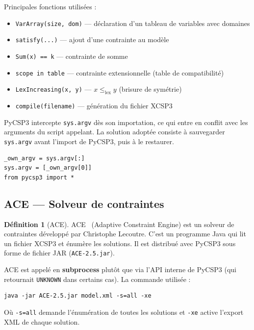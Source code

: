 \documentclass[12pt,a4paper]{article}
\theoremstyle{definition}
\newtheorem{definition}{Définition}[section]
\begin{document}
Principales fonctions utilisées :
\begin{itemize}
  \item \texttt{VarArray(size, dom)} — déclaration d'un tableau de variables avec domaines
  \item \texttt{satisfy(...)} — ajout d'une contrainte au modèle
  \item \texttt{Sum(x) == k} — contrainte de somme
  \item \texttt{scope in table} — contrainte extensionnelle (table de compatibilité)
  \item \texttt{LexIncreasing(x, y)} — $x \leq_{\text{lex}} y$ (brisure de symétrie)
  \item \texttt{compile(filename)} — génération du fichier XCSP3
\end{itemize}

\begin{attention}
  PyCSP3 intercepte \texttt{sys.argv} dès son importation, ce qui entre en conflit avec les
  arguments du script appelant. La solution adoptée consiste à sauvegarder \texttt{sys.argv}
  avant l'import de PyCSP3, puis à le restaurer.
  \begin{lstlisting}
_own_argv = sys.argv[:]
sys.argv = [_own_argv[0]]
from pycsp3 import *
  \end{lstlisting}
\end{attention}

\subsection{ACE — Solveur de contraintes}

\begin{definition}[ACE]
  ACE~\cite{ace} (Adaptive Constraint Engine) est un solveur de contraintes développé par
  Christophe Lecoutre. C'est un programme Java qui lit un fichier XCSP3 et énumère les
  solutions. Il est distribué avec PyCSP3 sous forme de fichier JAR
  (\texttt{ACE-2.5.jar}).
\end{definition}

ACE est appelé en \textbf{subprocess} plutôt que via l'API interne de PyCSP3 (qui retournait
\texttt{UNKNOWN} dans certains cas). La commande utilisée :

\begin{lstlisting}[style=benzai]
java -jar ACE-2.5.jar model.xml -s=all -xe
\end{lstlisting}

Où \texttt{-s=all} demande l'énumération de toutes les solutions et \texttt{-xe} active
l'export XML de chaque solution.
\end{document}
